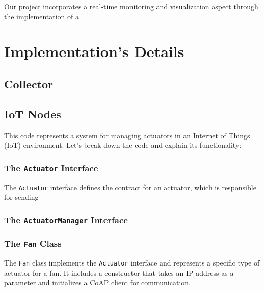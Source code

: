 \documentclass[parskip=full]{report}
\begin{document}
Our project incorporates a real-time monitoring and visualization aspect through the implementation of a 


\chapter{Implementation's Details}
\section{Collector}



\section{IoT Nodes}

	

	

		

		
		This code represents a system for managing actuators in an Internet of Things (IoT) environment. Let's break down the code and explain its functionality:
		
		\subsection{The \texttt{Actuator} Interface}
		
		The \texttt{Actuator} interface defines the contract for an actuator, which is responsible for sending 
		
		\subsection{The \texttt{ActuatorManager} Interface}
	
		
		\subsection{The \texttt{Fan} Class}
		
		The \texttt{Fan} class implements the \texttt{Actuator} interface and represents a specific type of actuator for a fan. It includes a constructor that takes an IP address as a parameter and initializes a CoAP client for communication.
	
		
	
\end{document}

